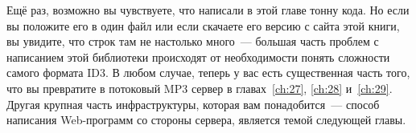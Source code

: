 Ещё раз, возможно вы чувствуете, что написали в этой главе тонну кода. Но если вы положите
его в один файл или если скачаете его версию с сайта этой книги, вы увидите, что строк там
не настолько много~--- большая часть проблем с написанием этой библиотеки происходят от
необходимости понять сложности самого формата ID3. В любом случае, теперь у вас есть
существенная часть того, что вы превратите в потоковый MP3 сервер в главах~\ref{ch:27},
\ref{ch:28} и~\ref{ch:29}. Другая крупная часть инфраструктуры, которая вам
понадобится~--- способ написания Web-программ со стороны сервера, является темой следующей
главы.

